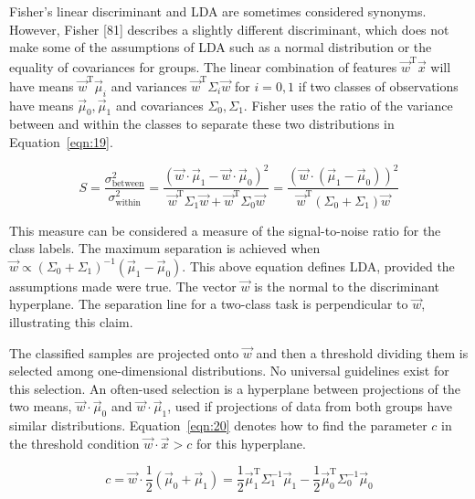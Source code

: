 \documentclass[preprint,12pt]{elsarticle}
\begin{document}
Fisher's linear discriminant and LDA are sometimes considered synonyms. However, Fisher [81] describes a slightly different discriminant, which does not make some of the assumptions of LDA such as a normal distribution or the equality of covariances for groups. The linear combination of features ${\vec{w}}^{\mathrm{T}}{\vec{x}}$ will have means ${\vec{w}}^{\mathrm{T}}{\vec{\mu}}_{i}$ and variances ${\vec{w}}^{\mathrm{T}}\Sigma_{i}{\vec{w}}$ for $i=0,1$ if two classes of observations have means ${\vec{\mu}}_{0},{\vec{\mu}}_{1}$ and covariances $\Sigma_{0},\Sigma_{1}$. Fisher uses the ratio of the variance between and within the classes to separate these two distributions in Equation~\ref{eqn:19}.

\begin{equation}
	S={\frac{\sigma_{\text{between}}^{2}}{\sigma_{\text{within}}^{2}}}={\frac{({\vec{w}}\cdot{\vec{\mu}}_{1}-{\vec{w}}\cdot {\vec{\mu}}_{0})^{2}}{{\vec{w}}^{\mathrm{T}}\Sigma_{1}{\vec{w}}+{\vec{w}}^{\mathrm{T}}\Sigma_{0}{\vec{w}}}}={\frac{({\vec{w}}\cdot ({\vec{\mu}}_{1}-{\vec{\mu}}_{0}))^{2}}{{\vec{w}}^{\mathrm{T}}(\Sigma_{0}+\Sigma_{1}){\vec{w}}}}
	\label{eqn:19}
\end{equation}

This measure can be considered a measure of the signal-to-noise ratio for the class labels. The maximum separation is achieved when ${\vec{w}}\propto\left(\Sigma_{0}+\Sigma_{1}\right)^{-1}\left({\vec{\mu}}_{1}-{\vec{\mu}}_{0}\right)$. This above equation defines LDA, provided the assumptions made were true.
The vector  $\vec{w}$ is the normal to the discriminant hyperplane. The separation line for a two-class task is perpendicular to $\vec{w}$, illustrating this claim.

The classified samples are projected onto $\vec{w}$ and then a threshold dividing them is selected among one-dimensional distributions. No universal guidelines exist for this selection. An often-used selection is a hyperplane between projections of the two means, ${\vec{w}}\cdot {\vec{\mu}}_{0}$ and $ \vec{w} \cdot {\vec{\mu}}_{1}$, used if projections of data from both groups have similar distributions. 
Equation~\ref{eqn:20} denotes how to find the parameter $c$ in the threshold condition ${\vec{w}}\cdot {\vec{x}} > c$ for this hyperplane.

\begin{equation}
	c={\vec{w}}\cdot {\frac{1}{2}}({\vec{\mu}}_{0}+{\vec{\mu}}_{1})={\frac{1}{2}}{\vec{\mu}}_{1}^{\mathrm{T}}\Sigma_{1}^{-1}{\vec{\mu}}_{1}-{\frac{1}{2}}{\vec{\mu}}_{0}^{\mathrm{T}}\Sigma_{0}^{-1}{\vec{\mu}}_{0}
	\label{eqn:20}
\end{equation}
\end{document}
